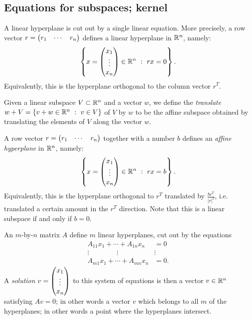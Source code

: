 \documentclass{article}
\begin{document}
\subsection{Equations for subspaces; kernel}


\begin{Example}
A linear hyperplane is cut out by a single linear equation. More
precisely, a row vector \(r=\begin{pmatrix} r_1 & \cdots & r_n\end{pmatrix}\) defines a
linear hyperplane in \(\mathbb{R}^n\), namely: \[\left\{x=\begin{pmatrix} x_1 \\ \vdots \\
x_n\end{pmatrix}\in\mathbb{R}^n\ :\ rx=0\right\}.\] Equivalently, this is the
hyperplane orthogonal to the column vector \(r^T\).


\end{Example}
\begin{Definition}
Given a linear subspace \(V\subset\mathbb{R}^n\) and a vector \(w\), we
define the {\em translate} \(w+V=\{v+w\in\mathbb{R}^n\ :\ v\in V\}\) of
\(V\) by \(w\) to be the affine subspace obtained by translating the
elements of \(V\) along the vector \(w\).


\end{Definition}
\begin{Example}
A row vector \(r=\begin{pmatrix} r_1 & \cdots & r_n\end{pmatrix}\) together with a number
\(b\) defines an {\em affine hyperplane} in \(\mathbb{R}^n\), namely:
\[\left\{x=\ma x_1\\ \vdots\\ x_n\mz\in\RR^n\ :\ rx=b\right\}.\]
Equivalently, this is the hyperplane orthogonal to \(r^T\)
translated by \(\frac{br^T}{|r|^2}\), i.e. translated a certain
amount in the \(r^T\) direction. Note that this is a linear subspace
if and only if \(b=0\).


\end{Example}
\begin{Example}
An \(m\)-by-\(n\) matrix \(A\) define \(m\) linear hyperplanes, cut
out by the equations
\begin{align*}
A_{11}x_1+\cdots+A_{1n}x_n&=0\\
\vdots\qquad\qquad\vdots\qquad\qquad&\vdots\\
A_{m1}x_1+\cdots+A_{mn}x_n&=0.
\end{align*}
A {\em solution} \(v=\begin{pmatrix} x_1 \\ \vdots \\ x_n\end{pmatrix}\) to this system of
equations is then a vector \(v\in\mathbb{R}^n\) satisfying \(Av=0\); in
other words a vector \(v\) which belongs to all \(m\) of the
hyperplanes; in other words a point where the hyperplanes intersect.


\end{Example}
\end{document}
